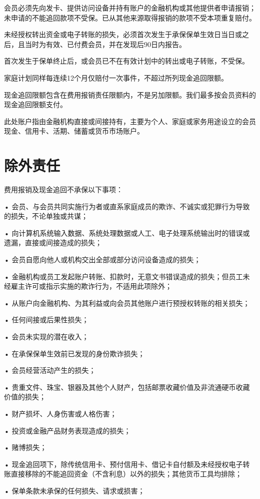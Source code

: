 \documentclass[UTF8,fontset=none,11pt,a4paper]{ctexart}
\begin{document}
会员必须先向发卡、提供访问设备并持有账户的金融机构或其他提供者申请报销；未申请的不能追回款项不受保。已从其他来源取得报销的款项不受本项重复赔付。


未经授权转出资金或电子转账的损失，必须首次发生于承保保单生效日当日或之后，且当时为有效、已付费会员，并在发现后90日内报告。


首次发生于保单终止后，或会员已不在有效计划中的转出或电子转账，不受保。


家庭计划同样每连续12个月仅赔付一次事件，不超过所列现金追回限额。


现金追回限额包含在费用报销责任限额内，不是另加限额。我们最多按会员资料的现金追回限额支付。


此处账户指由金融机构直接或间接持有，主要为个人、家庭或家务用途设立的会员现金、信用卡、活期、储蓄或货币市场账户。


\section*{除外责任}
费用报销及现金追回不承保以下事项：


• 会员、与会员共同实施行为者或直系家庭成员的欺诈、不诚实或犯罪行为导致的损失，不论单独或共谋；


• 向计算机系统输入数据、系统处理数据或人工、电子处理系统输出时的错误或遗漏，直接或间接造成的损失；


• 会员自愿向他人或机构交出全部或部分访问设备造成的损失；


• 金融机构或员工发起账户转账、扣款时，无意文书错误造成的损失；但员工未经雇主许可或指示实施的欺诈行为，不适用此项除外；


• 从账户向金融机构、为其利益或向会员其他账户进行预授权转账的相关损失；


• 任何间接或后果性损失；


• 会员未实现的潜在收入；


• 在承保保单生效前已发现的身份欺诈损失；


• 会员经营活动产生的损失；


• 贵重文件、珠宝、银器及其他个人财产，包括邮票收藏价值及非流通硬币收藏价值的损失；


• 财产损坏、人身伤害或人格伤害；


• 投资或金融产品财务表现造成的损失；


• 赌博损失；


• 现金追回项下，除传统信用卡、预付信用卡、借记卡自付额及未经授权电子转账直接移除的不能追回资金（不含利息）以外的损失；其他货币工具均排除；


• 保单条款未承保的任何损失、请求或损害；
\end{document}
